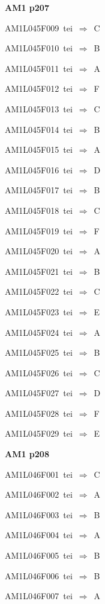 \par\vfill\eject
{\bf\hfill AM1 p207\hfill\hbox{}}\par\bigskip
{\sixrm AM1L045F009\ {\sixit tei}\ }$\Rightarrow$\ C\par\smallskip
{\sixrm AM1L045F010\ {\sixit tei}\ }$\Rightarrow$\ B\par\smallskip
{\sixrm AM1L045F011\ {\sixit tei}\ }$\Rightarrow$\ A\par\smallskip
{\sixrm AM1L045F012\ {\sixit tei}\ }$\Rightarrow$\ F\par\smallskip
{\sixrm AM1L045F013\ {\sixit tei}\ }$\Rightarrow$\ C\par\smallskip
{\sixrm AM1L045F014\ {\sixit tei}\ }$\Rightarrow$\ B\par\smallskip
{\sixrm AM1L045F015\ {\sixit tei}\ }$\Rightarrow$\ A\par\smallskip
{\sixrm AM1L045F016\ {\sixit tei}\ }$\Rightarrow$\ D\par\smallskip
{\sixrm AM1L045F017\ {\sixit tei}\ }$\Rightarrow$\ B\par\smallskip
{\sixrm AM1L045F018\ {\sixit tei}\ }$\Rightarrow$\ C\par\smallskip
{\sixrm AM1L045F019\ {\sixit tei}\ }$\Rightarrow$\ F\par\smallskip
{\sixrm AM1L045F020\ {\sixit tei}\ }$\Rightarrow$\ A\par\smallskip
{\sixrm AM1L045F021\ {\sixit tei}\ }$\Rightarrow$\ B\par\smallskip
{\sixrm AM1L045F022\ {\sixit tei}\ }$\Rightarrow$\ C\par\smallskip
{\sixrm AM1L045F023\ {\sixit tei}\ }$\Rightarrow$\ E\par\smallskip
{\sixrm AM1L045F024\ {\sixit tei}\ }$\Rightarrow$\ A\par\smallskip
{\sixrm AM1L045F025\ {\sixit tei}\ }$\Rightarrow$\ B\par\smallskip
{\sixrm AM1L045F026\ {\sixit tei}\ }$\Rightarrow$\ C\par\smallskip
{\sixrm AM1L045F027\ {\sixit tei}\ }$\Rightarrow$\ D\par\smallskip
{\sixrm AM1L045F028\ {\sixit tei}\ }$\Rightarrow$\ F\par\smallskip
{\sixrm AM1L045F029\ {\sixit tei}\ }$\Rightarrow$\ E\par\smallskip

\par\vfill\eject
{\bf\hfill AM1 p208\hfill\hbox{}}\par\bigskip
{\sixrm AM1L046F001\ {\sixit tei}\ }$\Rightarrow$\ C\par\smallskip
{\sixrm AM1L046F002\ {\sixit tei}\ }$\Rightarrow$\ A\par\smallskip
{\sixrm AM1L046F003\ {\sixit tei}\ }$\Rightarrow$\ B\par\smallskip
{\sixrm AM1L046F004\ {\sixit tei}\ }$\Rightarrow$\ A\par\smallskip
{\sixrm AM1L046F005\ {\sixit tei}\ }$\Rightarrow$\ B\par\smallskip
{\sixrm AM1L046F006\ {\sixit tei}\ }$\Rightarrow$\ B\par\smallskip
{\sixrm AM1L046F007\ {\sixit tei}\ }$\Rightarrow$\ A\par\smallskip

